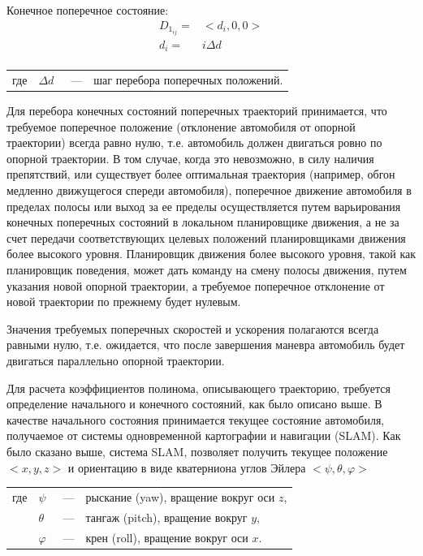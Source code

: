 Конечное поперечное состояние:
\begin{equation}
      \begin{aligned}
            D_{1_{ij}} =& <d_i, 0, 0> \\
            d_i =& i\Delta d \\
      \end{aligned}
\end{equation}
\noindent\begin{tabularx}{\linewidth}{lllX}
      где & $\Delta d$  &~---& шаг перебора поперечных положений.
\end{tabularx}

Для перебора конечных состояний поперечных траекторий принимается, что требуемое поперечное положение (отклонение
автомобиля от опорной траектории) всегда равно нулю, т.е. автомобиль должен двигаться ровно по опорной траектории.
В том случае, когда это невозможно, в силу наличия препятствий, или существует более оптимальная траектория (например,
обгон медленно движущегося спереди автомобиля), поперечное движение автомобиля в пределах полосы или выход за ее пределы
осуществляется путем варьирования конечных поперечных состояний в локальном планировщике движения, а не за счет передачи
соответствующих целевых положений планировщиками движения более высокого уровня. Планировщик движения более
высокого уровня, такой как планировщик поведения, может дать команду на смену полосы движения, путем указания
новой опорной траектории, а требуемое  поперечное отклонение от новой траектории по прежнему будет нулевым.

Значения требуемых поперечных скоростей и ускорения полагаются всегда равными нулю, т.е. ожидается, что после завершения
маневра автомобиль будет двигаться параллельно опорной траектории.

Для расчета коэффициентов полинома, описывающего траекторию, требуется определение начального и конечного состояний, как
было описано выше. В качестве начального состояния принимается текущее состояние автомобиля, получаемое от системы
одновременной картографии и навигации (SLAM). Как было сказано выше, система SLAM, позволяет получить текущее положение
$<x, y, z>$ и ориентацию в виде кватерниона углов Эйлера $<\psi, \theta, \varphi>$
\noindent\begin{tabularx}{\linewidth}{lllX}
      где & $\psi$    &~---& рыскание (yaw), вращение вокруг оси $z$, \\
          & $\theta$  &~---& тангаж (pitch), вращение вокруг $y$, \\
          & $\varphi$ &~---& крен (roll), вращение вокруг оси $x$.
\end{tabularx}

